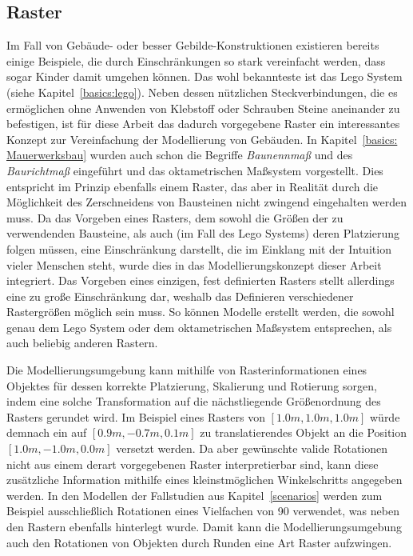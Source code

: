 \subsection{Raster}\label{concept:raster}
Im Fall von Gebäude- oder besser Gebilde-Konstruktionen existieren bereits einige Beispiele, die durch Einschränkungen so stark vereinfacht werden, dass sogar Kinder damit umgehen können.
Das wohl bekannteste ist das Lego System (siehe Kapitel~\ref{basics:lego}).
Neben dessen nützlichen Steckverbindungen, die es ermöglichen ohne Anwenden von Klebstoff oder Schrauben Steine aneinander zu befestigen, ist für diese Arbeit das dadurch vorgegebene Raster ein interessantes Konzept zur Vereinfachung der Modellierung von Gebäuden.
In Kapitel~\ref{basics: Mauerwerksbau} wurden auch schon die Begriffe \textit{Baunennmaß} und des \textit{Baurichtmaß} eingeführt und das oktametrischen Maßsystem vorgestellt.
Dies entspricht im Prinzip ebenfalls einem Raster, das aber in Realität durch die Möglichkeit des Zerschneidens von Bausteinen nicht zwingend eingehalten werden muss.
Da das Vorgeben eines Rasters, dem sowohl die Größen der zu verwendenden Bausteine, als auch (im Fall des Lego Systems) deren Platzierung folgen müssen, eine Einschränkung darstellt, die im Einklang mit der Intuition vieler Menschen steht, wurde dies in das Modellierungskonzept dieser Arbeit integriert.
Das Vorgeben eines einzigen, fest definierten Rasters stellt allerdings eine zu große Einschränkung dar, weshalb das Definieren verschiedener Rastergrößen möglich sein muss.
So können Modelle erstellt werden, die sowohl genau dem Lego System oder dem oktametrischen Maßsystem entsprechen, als auch beliebig anderen Rastern.

Die Modellierungsumgebung kann mithilfe von Rasterinformationen eines Objektes für dessen korrekte Platzierung, Skalierung und Rotierung sorgen, indem eine solche Transformation auf die nächstliegende Größenordnung des Rasters gerundet wird.
Im Beispiel eines Rasters von \([1.0m, 1.0m, 1.0m]\) würde demnach ein auf \([0.9m, -0.7m, 0.1m]\) zu translatierendes Objekt an die Position \([1.0m, -1.0m, 0.0m]\) versetzt werden.
Da aber gewünschte valide Rotationen nicht aus einem derart vorgegebenen Raster interpretierbar sind, kann diese zusätzliche Information mithilfe eines kleinstmöglichen Winkelschritts angegeben werden.
In den Modellen der Fallstudien aus Kapitel~\ref{scenarios} werden zum Beispiel ausschließlich Rotationen eines Vielfachen von 90\degree{} verwendet, was neben den Rastern ebenfalls hinterlegt wurde.
Damit kann die Modellierungsumgebung auch den Rotationen von Objekten durch Runden eine Art Raster aufzwingen.

